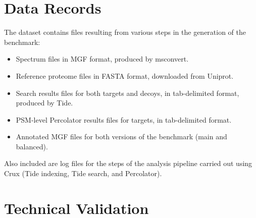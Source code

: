 \documentclass{article}
\newcommand{\fixme}[1]{{\color{red}{\bf #1}\color{black}}}
\begin{document}
\section*{Data Records}

The dataset contains files resulting from various steps in the generation of the benchmark:
\begin{itemize}
\item Spectrum files in MGF format, produced by msconvert.
\item Reference proteome files in FASTA format, downloaded from Uniprot.
\item Search results files for both targets and decoys, in tab-delimited format, produced by Tide.
\item PSM-level Percolator results files for targets, in tab-delimited format.
\item Annotated MGF files for both versions of the benchmark (main and balanced).
\end{itemize}
Also included are log files for the steps of the analysis pipeline carried out using Crux \cite{park2008rapid} (Tide indexing, Tide search, and Percolator).
\fixme{Add Zenodo URLs.}

\section*{Technical Validation}
\end{document}
